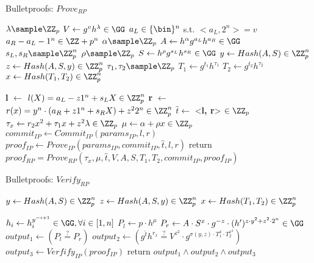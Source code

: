 \begin{algorithm}
 \DontPrintSemicolon
    \caption{Bulletproofs: $Prove_{RP}$}
    \label{alg:prove_rp}
    \LinesNumbered
    
    
    $\lambda \sample \ZZ_p$ \;
    $V \gets g^vh^\lambda \in \GG$ \;
    $a_L \in \{\bin\}^n$ s.t. $<a_L, 2^n> = v$ \;
    $a_R - a_L - 1^n \in \ZZ+p^n$ \;
    $\alpha \sample \ZZ_p$\;
    $A \gets h^\alpha g^{a_L}h^{a_R} \in \GG$ \;
    $s_L, s_R \sample \ZZ_p^n$\;
    $\rho \sample \ZZ_p$\;
    $S \gets h^\rho g^{s_L} h^{s_R} \in \GG$ \;
    $ y \gets Hash(A, S) \in \ZZ_p^n$ \;
    $ z \gets Hash(A, S, y) \in \ZZ_p^n$ \;
    $\tau_1, \tau_2 \sample \ZZ_p$ \;
    $T_1 \gets g^{t_1} h^{\tau_1}$ \;
    $T_2 \gets g^{t_2} h^{\tau_2}$ \;
    $ x \gets Hash(T_1, T_2) \in \ZZ_p^n$ \;
    
    \textbf{l} $\gets$ $l(X) = a_L - z1^n + s_LX \in \ZZ_p^n$ \;
    \textbf{r} $\gets$ $r(x) = y^n \cdot (a_R + z1^n + s_R X) + z^22^n \in \ZZ_p^n$ \;
    $\hat{t} \gets $ <\textbf{l, r}> $\in \ZZ_p$ \;
    $\tau_x \gets r_2x^2 + \tau_1 x + z^2\lambda  \in \ZZ_p$ \;
    $\mu \gets \alpha + \rho x \in \ZZ_p$ \;
    $commit_{IP} \gets Commit_{IP}(params_{IP}, l, r)$ \;
    $proof_{IP} \gets Prove_{IP}(params_{IP}, commit_{IP}, \hat{t}, l, r)$ \;
    return $proof_{RP} = Prove_{RP}(\tau_x, \mu, \hat{t}, V, A, S, T_1, T_2, commit_{IP}, proof_{IP})$ \;
\end{algorithm}

\begin{algorithm}
 \DontPrintSemicolon
    \caption{Bulletproofs: $Verify_{RP}$}
    \label{alg:verify_rp}
    \LinesNumbered

    
    $ y \gets Hash(A, S) \in \ZZ_p^n$ \;
    $ z \gets Hash(A, S, y) \in \ZZ_p^n$ \;
    $ x \gets Hash(T_1, T_2) \in \ZZ_p^n$ \;
    
    $h_i \gets h_i^{y^{-i + 1}} \in \GG, \forall i \in [1, n]$\;
    $P_l \gets p \cdot h^\mu $\;
    $P_r \gets A\cdot S^x\cdot g^{-z} \cdot (h')^{z\cdot y^2 + z^2 \cdot 2^n} \in \GG$\;
    $output_1 \gets (P_l \overset{?}{=}P_r)$ \;
    $output_2 \gets (g^{\hat{t}} h^{r_x} \overset{?}{=} V^{z^2}\cdot g^{\sigma(y, z)\cdot T_1^x \cdot T_2^{x^2}})$ \;
    $output_3 \gets Verfify_{IP}(proof_{IP})$ \;
    return $output_1 \land output_2 \land output_3$ 
\end{algorithm}

